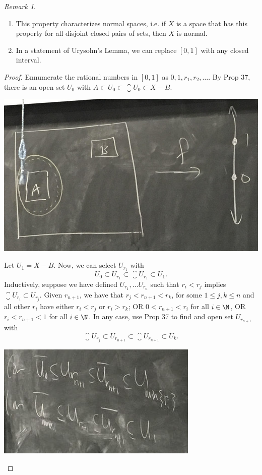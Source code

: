 \documentclass[a5paper]{article}
\theoremstyle{definition}%
\numberwithin{exercise}{section}
\theoremstyle{remark}%
\newtheorem*{remark*}{Remark}
\begin{document}
\begin{remark*}\mbox{}
\begin{enumerate}
\item This property characterizes normal spaces, i.e. if $X$ is a space that has this property for all disjoint closed pairs of sets, then $X$ is normal. 
\item In a statement of Urysohn's Lemma, we can replace $[0,1]$ with any closed interval. 
\end{enumerate}
\end{remark*}

\begin{proof}
Ennumerate the rational numbers in $[0,1]$ as $0,1,r_1, r_2, \ldots$. By Prop 37, there is an open set $U_0$ with $A \subset U_0 \subset \closure{U_0} \subset X-B$. 

\begin{center}
\includegraphics[scale=.18]{images/separation_5}
\end{center}

Let $U_1=X-B$. Now, we can select $U_{r_1}$ with 
$$U_0 \subset U_{r_1} \subset \closure{U_{r_1}} \subset U_1.$$
Inductively, suppose we have defined $U_{r_1}, \ldots U_{r_n}$ such that $r_i<r_j$ implies $\closure{U_{r_i}}\subset U_{r_j}$. Given $r_{n+1}$, we have that $r_j<r_{n+1}<r_k$, for some $1\leq j,k \leq n$ and all other $r_i$ have either $r_i<r_j$ or $r_i>r_k$; OR
$0<r_{n+1}<r_i$ for all $i\in \N$, OR $r_i<r_{n+1}<1$ for all $i\in \N$. In any case, use Prop 37 to find and open set $U_{r_{n+1}}$ with 
$$\closure{U_{r_j}}\subset U_{r_{n+1}} \subset \closure{U_{r_{n+1}}} \subset U_k.$$

\begin{center}
\includegraphics[scale=.35]{images/separation_6}
\end{center}


\end{proof}
\end{document}
